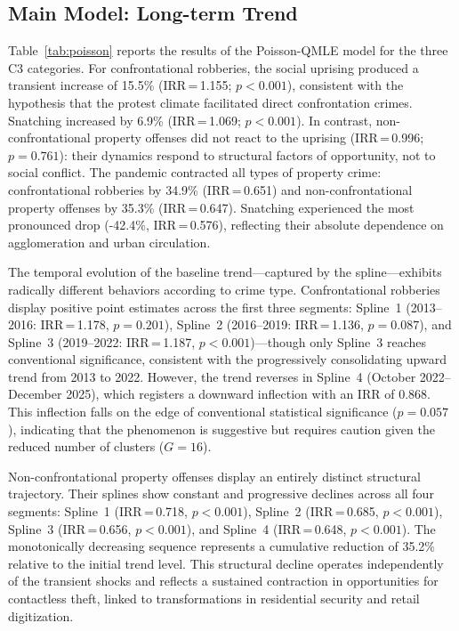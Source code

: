 \documentclass[pdflatex,sn-basic]{sn-jnl}
\begin{document}
\subsection{Main Model: Long-term Trend}
\label{sub:inferencial}

Table~\ref{tab:poisson} reports the results of the Poisson-QMLE model for the three C3 categories. For confrontational robberies, the social uprising produced a transient increase of 15.5\% (IRR\,=\,1.155; $p<0.001$), consistent with the hypothesis that the protest climate facilitated direct confrontation crimes. Snatching increased by 6.9\% (IRR\,=\,1.069; $p<0.001$). In contrast, non-confrontational property offenses did not react to the uprising (IRR\,=\,0.996; $p=0.761$): their dynamics respond to structural factors of opportunity, not to social conflict. The pandemic contracted all types of property crime: confrontational robberies by 34.9\% (IRR\,=\,0.651) and non-confrontational property offenses by 35.3\% (IRR\,=\,0.647). Snatching experienced the most pronounced drop (-42.4\%, IRR\,=\,0.576), reflecting their absolute dependence on agglomeration and urban circulation.

The temporal evolution of the baseline trend---captured by the spline---exhibits radically different behaviors according to crime type. Confrontational robberies display positive point estimates across the first three segments: Spline~1 (2013--2016: IRR\,=\,1.178, $p=0.201$), Spline~2 (2016--2019: IRR\,=\,1.136, $p=0.087$), and Spline~3 (2019--2022: IRR\,=\,1.187, $p<0.001$)---though only Spline~3 reaches conventional significance, consistent with the progressively consolidating upward trend from 2013 to 2022. However, the trend reverses in Spline~4 (October 2022--December 2025), which registers a downward inflection with an IRR of 0.868. This inflection falls on the edge of conventional statistical significance ($p=0.057$), indicating that the phenomenon is suggestive but requires caution given the reduced number of clusters ($G=16$). 

Non-confrontational property offenses display an entirely distinct structural trajectory. Their splines show constant and progressive declines across all four segments: Spline~1 (IRR\,=\,0.718, $p<0.001$), Spline~2 (IRR\,=\,0.685, $p<0.001$), Spline~3 (IRR\,=\,0.656, $p<0.001$), and Spline~4 (IRR\,=\,0.648, $p<0.001$). The monotonically decreasing sequence represents a cumulative reduction of 35.2\% relative to the initial trend level. This structural decline operates independently of the transient shocks and reflects a sustained contraction in opportunities for contactless theft, linked to transformations in residential security and retail digitization.
\end{document}
